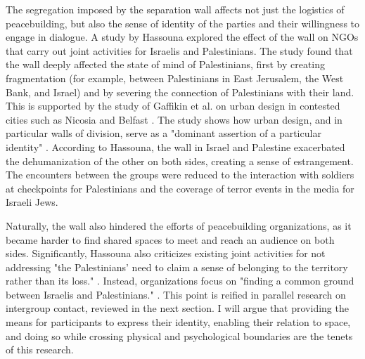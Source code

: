 \documentclass[dissertation,math,vertlayout,pdfa,colorlinks]{aaltoseries}
\begin{document}
The segregation imposed by the separation wall affects not just the logistics of peacebuilding, but also the sense of identity of the parties and their willingness to engage in dialogue. A study by Hassouna \cite{hassounaSpacesDialogueSegregated2016} explored the effect of the wall on NGOs that carry out joint activities for Israelis and Palestinians. The study found that the wall deeply affected the state of mind of Palestinians, first by creating fragmentation (for example, between Palestinians in East Jerusalem, the West Bank, and Israel) and by severing the connection of Palestinians with their land. This is supported by the study of Gaffikin et al. on urban design in contested cities such as Nicosia and Belfast \cite{gaffikinCreatingSharedPublic2010}. The study shows how urban design, and in particular walls of division, serve as a "dominant assertion of a particular identity" \cite{gaffikinCreatingSharedPublic2010}. According to Hassouna, the wall in Israel and Palestine exacerbated the dehumanization of the other on both sides, creating a sense of estrangement. The encounters between the groups were reduced to the interaction with soldiers at checkpoints for Palestinians and the coverage of terror events in the media for Israeli Jews.

Naturally, the wall also hindered the efforts of peacebuilding organizations, as it became harder to find shared spaces to meet and reach an audience on both sides. Significantly, Hassouna also criticizes existing joint activities for not addressing "the Palestinians’ need to claim a sense of belonging to the territory rather than its loss." \cite[p. 79]{hassounaSpacesDialogueSegregated2016}. Instead, organizations focus on "finding a common ground between Israelis and Palestinians." \cite[p. 79]{hassounaSpacesDialogueSegregated2016}. This point is reified in parallel research on intergroup contact, reviewed in the next section. I will argue that providing the means for participants to express their identity, enabling their relation to space,  and doing so while crossing physical and psychological boundaries are the tenets of this research.
\end{document}

